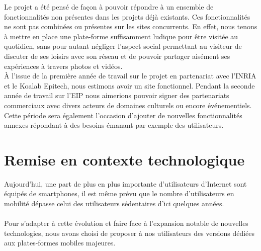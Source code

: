 \documentclass{life-fr}
\begin{document}
Le projet a été pensé de façon à pouvoir répondre à un ensemble de fonctionnalités non présentes dans les projets déjà existants. Ces fonctionnalités ne sont pas combinées ou présentes sur les sites concurrents. En effet, nous tenons à mettre en place une plate-forme suffisamment ludique pour être visitée au quotidien, sans pour autant négliger l’aspect social permettant au visiteur de discuter de ses loisirs avec son réseau et de pouvoir partager aisément ses expériences à travers photos et vidéos.\\

À l'issue de la première année de travail sur le projet en partenariat avec l'INRIA et le Koalab Epitech, nous estimons avoir un site fonctionnel. Pendant la seconde année de travail sur l'EIP nous aimerions pouvoir signer des partenariats commerciaux avec divers acteurs de domaines culturels ou encore événementiels. Cette période sera également l'occasion d'ajouter de nouvelles fonctionnalités annexes répondant à des besoins émanant par exemple des utilisateurs.

\newpage

\section{Remise en contexte technologique}

Aujourd'hui, une part de plus en plus importante d'utilisateurs d'Internet sont équipés de smartphones, il est même prévu que le nombre d'utilisateurs en mobilité dépasse celui des utilisateurs sédentaires d'ici quelques années.\\
\\
Pour s’adapter à cette évolution et faire face à l’expansion notable de nouvelles technologies, nous avons choisi de proposer à nos utilisateurs des versions dédiées aux plates-formes mobiles majeures.
\end{document}

